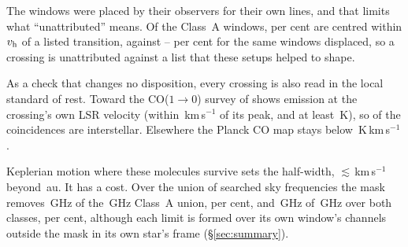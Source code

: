 The windows were placed by their observers for their own lines, and that
limits what ``unattributed'' means. Of the Class~A windows, \TnCenPct{} per
cent are centred within $v_{\rm h}$ of a listed transition, against
\TnCtrlCenLo--\TnCtrlCenHi{} per cent for the same windows displaced, so a
crossing is unattributed against a list that these setups helped to shape.

As a check that changes no disposition, every crossing is also read in the
local standard of rest. Toward
\LsCloudStars{} the CO($1\to0$) survey of \citet{DameThaddeus2022,Dame2001}
shows emission at the crossing's own LSR velocity (within
\LsCloudDvMax\,km\,s$^{-1}$ of its peak, and at least \LsCloudTMin\,K), so
\LsNCloud{} of the coincidences are interstellar. Elsewhere the Planck CO
map \citep{PlanckCO2016} stays below
\LsPlanckMax\,K\,km\,s$^{-1}$.

Keplerian motion where these molecules survive sets the half-width,
$\lesssim$\EcKepVKms\,km\,s$^{-1}$ beyond \EcKepRAu\,au. It has a cost.
Over the union of searched sky frequencies the mask removes \MkMaskAGHz\,GHz
of the \CvUnionA\,GHz Class~A union, \MkMaskAPct{} per cent, and
\FrMaskLostGHz\,GHz of \FrMaskUnionGHz\,GHz over both classes, \FrMaskPct{}
per cent, although each limit is formed over its own window's channels
outside the mask in its own star's frame (\S\ref{sec:summary}).

\begin{table}
\centering
\footnotesize
\caption{The line mask, by species: the number $N$ of transitions, the
frequency range they span inside the searched intervals and their
upper-state energies.}
\label{tab:masklines}

\end{table}
